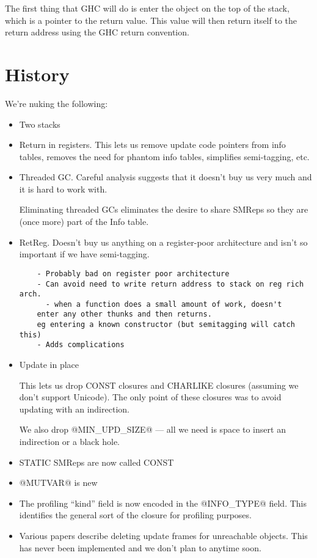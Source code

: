 \documentclass[11pt]{article}
\begin{document}
The first thing that GHC will do is enter the object on the top of the
stack, which is a pointer to the return value.  This value will then
return itself to the return address using the GHC return convention.


\fi


\part{History}

We're nuking the following:

\begin{itemize}
\item
  Two stacks

\item
  Return in registers.
  This lets us remove update code pointers from info tables,
  removes the need for phantom info tables, simplifies 
  semi-tagging, etc.

\item
  Threaded GC.
  Careful analysis suggests that it doesn't buy us very much
  and it is hard to work with.

  Eliminating threaded GCs eliminates the desire to share SMReps
  so they are (once more) part of the Info table.

\item
  RetReg.
  Doesn't buy us anything on a register-poor architecture and
  isn't so important if we have semi-tagging.

\begin{verbatim}
    - Probably bad on register poor architecture 
    - Can avoid need to write return address to stack on reg rich arch.
      - when a function does a small amount of work, doesn't 
  	enter any other thunks and then returns.
  	eg entering a known constructor (but semitagging will catch this)
    - Adds complications
\end{verbatim}

\item
  Update in place

  This lets us drop CONST closures and CHARLIKE closures (assuming we
  don't support Unicode).  The only point of these closures was to 
  avoid updating with an indirection.

  We also drop @MIN_UPD_SIZE@ --- all we need is space to insert an
  indirection or a black hole.

\item
  STATIC SMReps are now called CONST

\item
  @MUTVAR@ is new

\item The profiling ``kind'' field is now encoded in the @INFO_TYPE@ field.
This identifies the general sort of the closure for profiling purposes.

\item Various papers describe deleting update frames for unreachable objects.
  This has never been implemented and we don't plan to anytime soon.

\end{itemize}
\end{document}
